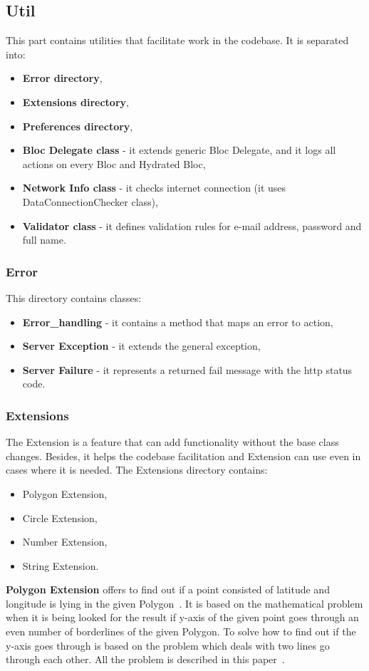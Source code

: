 \subsection{Util}\label{subsec:util}
This part contains utilities that facilitate work in the codebase.
It is separated into:
\begin{itemize}
    \item \textbf{Error directory},
    \item \textbf{Extensions directory},
    \item \textbf{Preferences directory},
    \item \textbf{Bloc Delegate class} - it extends generic Bloc Delegate, and it logs all actions on every Bloc and Hydrated Bloc,
    \item \textbf{Network Info class} - it checks internet connection (it uses DataConnectionChecker class),
    \item \textbf{Validator class} - it defines validation rules for e-mail address, password and full name.
\end{itemize}


\subsubsection{Error}\label{subsubsec:error}
This directory contains classes:
\begin{itemize}
    \item \textbf{Error\_handling} - it contains a method that maps an error to action,
    \item \textbf{Server Exception} - it extends the general exception,
    \item \textbf{Server Failure} - it represents a returned fail message with the \acrshort{http} status code.
\end{itemize}


\subsubsection{Extensions}\label{subsubsec:extensions}
The Extension is a feature that can add functionality without the base class changes.
Besides, it helps the codebase facilitation and Extension can use even in cases where it is needed.
The Extensions directory contains:
\begin{itemize}
    \item Polygon Extension,
    \item Circle Extension,
    \item Number Extension,
    \item String Extension.
\end{itemize}
\textbf{Polygon Extension} offers to find out if a point consisted of latitude and longitude is lying in the given Polygon~\cite{googleMapsPolygon}.
It is based on the mathematical problem when it is being looked for the result if y-axis of the given point goes through an even number of borderlines of the given Polygon.
To solve how to find out if the y-axis goes through is based on the problem which deals with two lines go through each other.
All the problem is described in this paper~\cite{geometricAlgorithms}.

